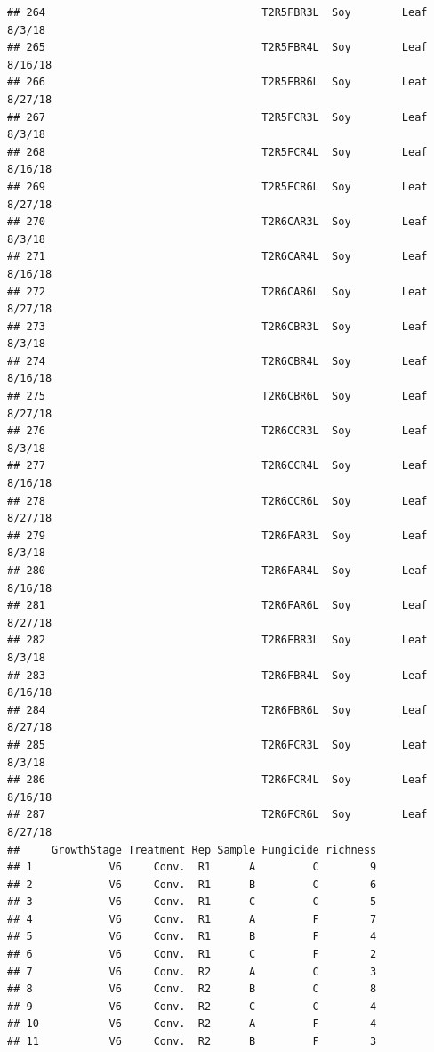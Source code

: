 \documentclass[
]{article}
\begin{document}
\begin{verbatim}
## 264                                  T2R5FBR3L  Soy        Leaf      8/3/18
## 265                                  T2R5FBR4L  Soy        Leaf     8/16/18
## 266                                  T2R5FBR6L  Soy        Leaf     8/27/18
## 267                                  T2R5FCR3L  Soy        Leaf      8/3/18
## 268                                  T2R5FCR4L  Soy        Leaf     8/16/18
## 269                                  T2R5FCR6L  Soy        Leaf     8/27/18
## 270                                  T2R6CAR3L  Soy        Leaf      8/3/18
## 271                                  T2R6CAR4L  Soy        Leaf     8/16/18
## 272                                  T2R6CAR6L  Soy        Leaf     8/27/18
## 273                                  T2R6CBR3L  Soy        Leaf      8/3/18
## 274                                  T2R6CBR4L  Soy        Leaf     8/16/18
## 275                                  T2R6CBR6L  Soy        Leaf     8/27/18
## 276                                  T2R6CCR3L  Soy        Leaf      8/3/18
## 277                                  T2R6CCR4L  Soy        Leaf     8/16/18
## 278                                  T2R6CCR6L  Soy        Leaf     8/27/18
## 279                                  T2R6FAR3L  Soy        Leaf      8/3/18
## 280                                  T2R6FAR4L  Soy        Leaf     8/16/18
## 281                                  T2R6FAR6L  Soy        Leaf     8/27/18
## 282                                  T2R6FBR3L  Soy        Leaf      8/3/18
## 283                                  T2R6FBR4L  Soy        Leaf     8/16/18
## 284                                  T2R6FBR6L  Soy        Leaf     8/27/18
## 285                                  T2R6FCR3L  Soy        Leaf      8/3/18
## 286                                  T2R6FCR4L  Soy        Leaf     8/16/18
## 287                                  T2R6FCR6L  Soy        Leaf     8/27/18
##     GrowthStage Treatment Rep Sample Fungicide richness
## 1            V6     Conv.  R1      A         C        9
## 2            V6     Conv.  R1      B         C        6
## 3            V6     Conv.  R1      C         C        5
## 4            V6     Conv.  R1      A         F        7
## 5            V6     Conv.  R1      B         F        4
## 6            V6     Conv.  R1      C         F        2
## 7            V6     Conv.  R2      A         C        3
## 8            V6     Conv.  R2      B         C        8
## 9            V6     Conv.  R2      C         C        4
## 10           V6     Conv.  R2      A         F        4
## 11           V6     Conv.  R2      B         F        3

\end{verbatim}
\end{document}
